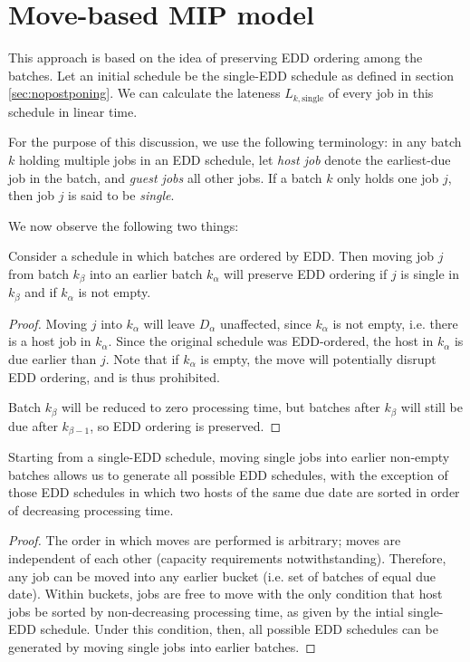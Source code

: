 \documentclass[13pt, letterpaper, oneside]{book}
\begin{document}
\section{Move-based MIP model}
\label{sec:movebackmip}
This approach is based on the idea of preserving EDD ordering among the batches.
Let an initial schedule be the single-EDD schedule as defined in section
\ref{sec:nopostponing}. We can calculate the lateness
$L_{k,\text{single}}$ of every job in this schedule in linear time.

For the purpose of this discussion, we use the following terminology: in any
batch $k$ holding multiple jobs in an EDD schedule, let \textit{host job} denote
the earliest-due job in the batch, and \textit{guest jobs} all other jobs. If a
batch $k$ only holds one job $j$, then job $j$ is said to be \textit{single}.
 
We now observe the following two things:
 
\begin{proposition}
Consider a schedule in which batches are ordered by EDD. Then moving job $j$
from batch $k_\beta$ into an earlier batch $k_\alpha$ will preserve EDD ordering
if $j$ is single in $k_\beta$ and if $k_\alpha$ is not empty.
\end{proposition}
\begin{proof}
Moving $j$ into $k_\alpha$ will leave $D_\alpha$ unaffected, since $k_\alpha$ is
not empty, i.e. there is a host job in $k_\alpha$. Since the original schedule
was EDD-ordered, the host in $k_\alpha$ is due earlier than $j$. Note that if
$k_\alpha$ is empty, the move will potentially disrupt EDD ordering, and is thus
prohibited.
 
Batch $k_\beta$ will be reduced to zero processing time, but batches after
$k_\beta$ will still be due after $k_{\beta - 1}$, so EDD ordering is preserved.
\end{proof}
 
\begin{proposition}
Starting from a single-EDD schedule, moving single jobs into earlier
non-empty batches allows us to generate all possible EDD schedules, with the exception
of those EDD schedules in which two hosts of the same due date are sorted in
order of decreasing processing time.
\end{proposition}
\begin{proof}
The order in which moves are performed is arbitrary; moves are independent of
each other (capacity requirements notwithstanding). Therefore, any job can be
moved into any earlier bucket (i.e. set of batches of equal due date). Within
buckets, jobs are free to move with the only condition that host jobs be sorted
by non-decreasing processing time, as given by the intial single-EDD schedule.
Under this condition, then, all possible EDD schedules can be generated by
moving single jobs into earlier batches. \end{proof}
\end{document}
